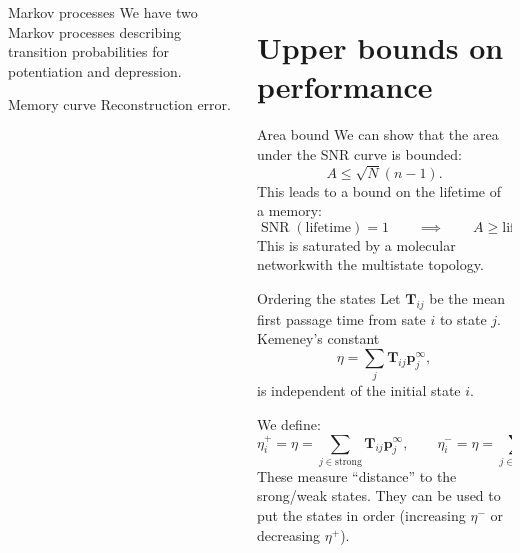 \documentclass[final,hyperref={pdfpagelabels=false}]{beamer}
\newcommand{\citerr}[1]{\hfill {\footnotesize{\color{darkgrey}\cite{#1}}}}
\DeclareMathOperator{\SNR}{SNR}
\newcommand{\net}{molecular network}
\newcommand{\eq}{\mathbf{p}^\infty}
\newcommand{\fpt}{\mathbf{T}}
\begin{document}
\begin{frame}{}
\begin{columns}[t]
\begin{column}{0.32\linewidth}

\begin{block}{Markov processes}
%
 We have two Markov processes describing transition probabilities for potentiation and depression.
%
\end{block}


\begin{block}{Memory curve}
%
 Reconstruction error.
%
\end{block}


\end{column}

\begin{column}{0.32\linewidth}

\section{Upper bounds on performance}


\begin{block}{Area bound}
%
 We can show that the area under the SNR curve is bounded:
 \begin{equation*}
   A \leq \sqrt{N}(n-1).
 \end{equation*}
 This leads to a bound on the lifetime of a memory:
 \begin{equation*}
   \SNR(\text{lifetime})=1
   \qquad
   \implies
   \qquad
   A \geq \text{lifetime}.
 \end{equation*}
 This is saturated by a \net with the multistate topology.
%
\end{block}


\begin{block}{Ordering the states}
%
 Let $\fpt_{ij}$ be the mean first passage time from sate $i$ to state $j$. Kemeney's constant
 \begin{equation*}
   \eta = \sum_j \fpt_{ij} \eq_j,
 \end{equation*}
 is independent of the initial state $i$. \citerr{kemeny1960finite}
 
 \vp We define:
 \begin{equation*}
   \eta^+_i = \eta = \sum_{j\in\text{strong}} \fpt_{ij} \eq_j,
   \qquad
   \eta^-_i = \eta = \sum_{j\in\text{weak}} \fpt_{ij} \eq_j.
 \end{equation*}
 These measure ``distance'' to the srong/weak states. 
 They can be used to put the states in order (increasing $\eta^-$ or decreasing $\eta^+$).
%
\end{block}








\end{column}
\end{columns}
\end{frame}
\end{document}
